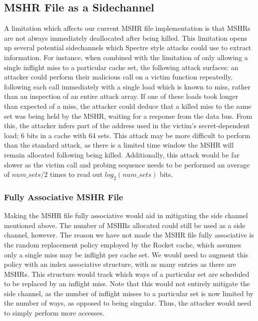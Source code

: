 \subsection{MSHR File as a Sidechannel}
A limitation which affects our current MSHR file implementation is that MSHRs are not always immediately deallocated after being killed. This limitation opens up several potential sidechannels which Spectre style attacks could use to extract information. For instance, when combined with the limitation of only allowing a single inflight miss to a particular cache set, the following attack surfaces: an attacker could perform their malicious call on a victim function repeatedly, following each call immediately with a single load which is known to miss, rather than an inspection of an entire attack array. If one of these loads took longer than expected of a miss, the attacker could deduce that a killed miss to the same set was being held by the MSHR, waiting for a response from the data bus. From this, the attacker infers part of the address used in the victim's secret-dependent load; 6 bits in a cache with 64 sets. This attack may be more difficult to perform than the standard attack, as there is a limited time window the MSHR will remain allocated following being killed. Additionally, this attack would be far slower as the victim call and probing sequence needs to be performed an average of $num\_sets/2$ times to read out $log_{2}(num\_sets)$ bits.

\subsubsection{Fully Associative MSHR File}
Making the MSHR file fully associative would aid in mitigating the side channel mentioned above. The number of MSHRs allocated could still be used as a side channel, however. The reason we have not made the MSHR file fully associative is the random replacement policy employed by the Rocket cache, which assumes only a single miss may be inflight per cache set. We would need to augment this policy with an index associative structure, with as many entries as there are MSHRs. This structure would track which ways of a particular set are scheduled to be replaced by an inflight miss. Note that this would not entirely mitigate the side channel, as the number of inflight misses to a particular set is now limited by the number of ways, as opposed to being singular. Thus, the attacker would need to simply perform more accesses.

